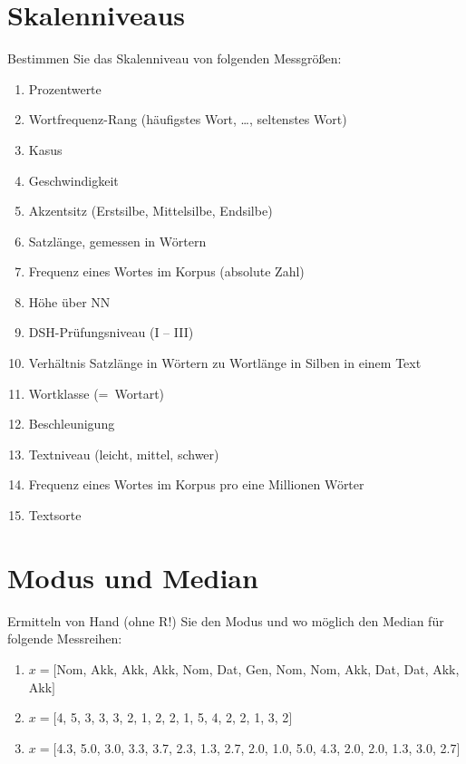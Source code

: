 \section{Skalenniveaus}

Bestimmen Sie das Skalenniveau von folgenden Messgrößen:

\begin{enumerate}\Lf
  \item Prozentwerte %
  \item Wortfrequenz-Rang (häufigstes Wort, \ldots, seltenstes Wort) %
  \item Kasus %
  \item Geschwindigkeit %
  \item Akzentsitz (Erstsilbe, Mittelsilbe, Endsilbe) %
  \item Satzlänge, gemessen in Wörtern %
  \item Frequenz eines Wortes im Korpus (absolute Zahl) %
  \item Höhe über NN %
  \item DSH-Prüfungsniveau (I -- III) %
  \item Verhältnis Satzlänge in Wörtern zu Wortlänge in Silben in einem Text %
  \item Wortklasse (=~Wortart) %
  \item Beschleunigung %
  \item Textniveau (leicht, mittel, schwer) %
  \item Frequenz eines Wortes im Korpus pro eine Millionen Wörter %
  \item Textsorte %
\end{enumerate}

\section{Modus und Median}
\label{sec:modmed}

Ermitteln von Hand (ohne R!) Sie den Modus und wo möglich den Median für folgende Messreihen:

\begin{enumerate}
  \item $x=[$Nom, Akk, Akk, Akk, Nom, Dat, Gen, Nom, Nom, Akk, Dat, Dat, Akk, Akk$]$
  \item $x=[$4, 5, 3, 3, 3, 2, 1, 2, 2, 1, 5, 4, 2, 2, 1, 3, 2$]$
  \item $x=[$4.3, 5.0, 3.0, 3.3, 3.7, 2.3, 1.3, 2.7, 2.0, 1.0, 5.0, 4.3, 2.0, 2.0, 1.3, 3.0, 2.7$]$
\end{enumerate}

